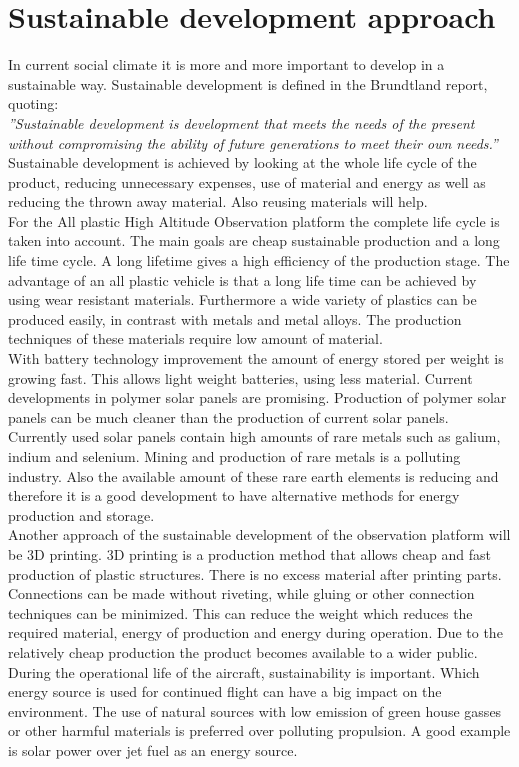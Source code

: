 \documentclass[a4paper]{report}
\begin{document}
\chapter{Sustainable development approach}
\label{Sustainable development approach}
In current social climate it is more and more important to develop in a sustainable way. Sustainable development is defined in the Brundtland report\cite{brundtland1987}, quoting:\\
\textit{''Sustainable development is development that meets the needs of the present without compromising the ability of future generations to meet their own needs.''}\\
Sustainable development is achieved by looking at the whole life cycle of the product, reducing unnecessary expenses, use of material and energy as well  as reducing the thrown away material. Also reusing materials will help.\\
For the All plastic High Altitude Observation platform the complete life cycle is taken into account. The main goals are cheap sustainable production and a long life time cycle. A long lifetime gives a high efficiency of the production stage. The advantage of an all plastic vehicle is that a long life time can be achieved by using wear resistant materials. Furthermore a wide variety of plastics can be produced easily, in contrast with metals and metal alloys. The production techniques of these materials require low amount of material.\\ 
With battery technology improvement the amount of energy stored per weight is growing fast. This allows light weight batteries, using less material. Current developments in polymer solar panels are promising. Production of polymer solar panels can be much cleaner than the production of current solar panels. Currently used solar panels contain high amounts of rare metals such as galium, indium and selenium. Mining and production of rare metals is a polluting industry. Also the available amount of these rare earth elements is reducing\cite{website:discovery.com1}\cite{website:phys.org1} and therefore it is a good development to have alternative methods for energy production and storage.\\
Another approach of the sustainable development of the observation platform will be 3D printing. 3D printing is a production method that allows cheap and fast production of plastic structures.  There is no excess material after printing parts. Connections can be made without riveting, while gluing or other connection techniques can be minimized. This can reduce the weight which reduces the required material, energy of production and energy during operation. Due to the relatively cheap  production the product becomes available to a wider public.\\
During the operational life of the aircraft, sustainability is important. Which energy source is used for continued flight can have a big impact on the environment. The use of natural sources with low emission of green house gasses or other harmful materials is preferred over polluting propulsion. A good example is solar power over jet fuel as an energy source.
\end{document}
